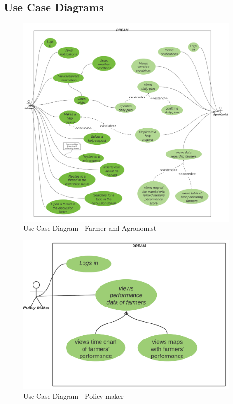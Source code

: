\subsection{Use Case Diagrams}
\begin{center}
\begin{figure}[H]
  \includegraphics[width=\textwidth,height=\textheight,keepaspectratio]{./Images/Use case Agronomist Farmer.png}
  \caption{Use Case Diagram - Farmer and Agronomist}
\end{figure}

\begin{figure}[H]
  \includegraphics[width=\textwidth,height=\textheight,keepaspectratio]{./Images/Use case Policy Maker.png}
  \caption{Use Case Diagram - Policy maker}
\end{figure}
\end{center}
